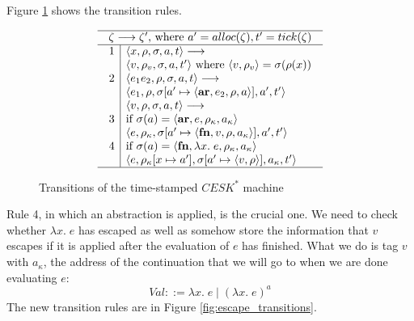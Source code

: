 \RequirePackage[hyphens]{url}\documentclass[12pt,oneside]{amsart}
\newcommand{\kw}[1]{\mathbf{#1}}
\newcommand{\lmd}[2]{\lambda #1.\;#2}
\begin{document}
Figure \ref{fig:transitions} shows the transition rules.
\begin{figure}[hbpt]
\[\begin{array}{c}\hline
\zeta \longrightarrow \zeta^\prime\text{, where } a^\prime = alloc(\zeta),
    t^\prime = tick(\zeta) \\ \hline
\begin{array}{l|l}
    1 & \langle x, \rho, \sigma, a, t\rangle \longrightarrow \\ &
        \langle v, \rho_v, \sigma, a, t^\prime\rangle \text{ where $\langle v, \rho_v\rangle = \sigma(\rho(x))$} \\
    2 & \langle e_1e_2, \rho, \sigma, a, t\rangle \longrightarrow \\ &
        \langle e_1, \rho, \sigma[a^\prime\mapsto\langle\kw{ar}, e_2, \rho, a\rangle], a^\prime, t^\prime\rangle \\
    & \langle v, \rho, \sigma, a, t\rangle \longrightarrow \\
    3 & \text{if $\sigma(a) = \langle\kw{ar}, e, \rho_\kappa, a_\kappa\rangle$} \\
        & \langle e, \rho_\kappa, \sigma[a^\prime\mapsto\langle\kw{fn}, v, \rho, a_\kappa\rangle], a^\prime, t^\prime\rangle \\
    4 & \text{if $\sigma(a) = \langle\kw{fn}, \lmd{x}{e}, \rho_\kappa,
        a_\kappa\rangle$} \\ & \langle e, \rho_\kappa[x\mapsto a^\prime], \sigma[a^\prime\mapsto \langle v, \rho\rangle], a_\kappa, t^\prime\rangle
\end{array} \\ \hline \end{array}\]
\caption{Transitions of the time-stamped $CESK^\ast$ machine}
\label{fig:transitions}
\end{figure}
Rule 4, in which an abstraction is applied, is the crucial one.  We need to check whether $\lmd{x}{e}$ has escaped as well as somehow store the information that $v$ escapes if it is applied after the evaluation of $e$ has finished.  What we do is tag $v$ with $a_\kappa$, the address of the continuation that we will go to when we are done evaluating $e$:
\[Val ::= \lmd{x}{e} \mid (\lmd{x}{e})^a\]
The new transition rules are in Figure \ref{fig:escape_transitions}.
\end{document}
